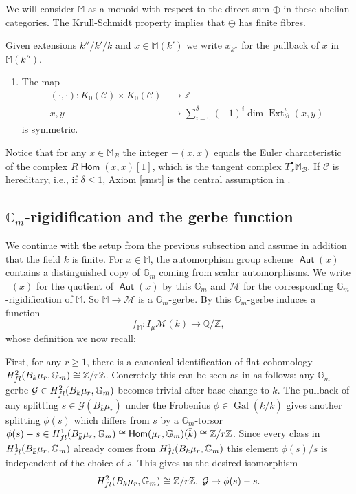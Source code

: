 \documentclass{article}
\newcommand{\Cc}{\mathcal{C}}
\DeclareMathOperator{\Hom}{\mathsf{Hom}}
\DeclareMathOperator{\Gal}{Gal}
\DeclareMathOperator{\Aut}{\mathsf{Aut}}
\DeclareMathOperator{\uAut}{\underline{\mathsf{Aut}}}
\DeclareMathOperator{\Bc}{\mathcal{B}}
\newcommand{\BG}{{\mathbb{G}}}
\newcommand{\BM}{{\mathbb{M}}}
\newcommand{\BQ}{{\mathbb{Q}}}
\newcommand{\BZ}{{\mathbb{Z}}}
\newcommand{\CG}{{\mathcal G}}
\newcommand{\CM}{{\mathcal M}}
\DeclareMathOperator{\Ext}{Ext}
\theoremstyle{definition}
\theoremstyle{plain}
\begin{document}
We will consider $\BM$ as a monoid with respect to the direct sum $\oplus$ in these abelian categories. The Krull-Schmidt property implies that $\oplus$ has finite fibres. 

Given extensions $k''/k'/k$ and $x \in \BM(k')$ we write $x_{k''}$ for the pullback of $x$ in $\BM(k'')$. 



\begin{enumerate}[resume]
    \item\label{smst} The map 
    \begin{align*} (\cdot,\cdot): K_0(\Cc) \times K_0(\Cc) &\to \BZ \\ x,y &\mapsto \sum_{i=0}^\delta  (-1)^i\dim\Ext^i_{\Bc}(x,y)
        \end{align*}
        is symmetric.
\end{enumerate}

Notice that for any $x \in \BM_{\Bc}$ the integer $-(x,x)$ equals the Euler characteristic of the complex $R\Hom(x,x)[1]$, which is the tangent complex $T^{\bullet}_x\BM_{\Bc}$.
If $\Cc$ is hereditary, i.e., if $\delta \leq 1$, Axiom \ref{smst} is the central assumption in \cite{Me15}. 


\subsection{$\BG_m$-rigidification and the gerbe function}\label{gmgr}

We continue with the setup from the previous subsection and assume in addition that the field $k$ is finite. For $x \in \BM$, the automorphism group scheme $\Aut(x)$ contains a distinguished copy of $\BG_m$ coming from scalar automorphisms. We write $\uAut(x)$ for the quotient of $\Aut(x)$ by this $\BG_m$ and $\CM$ for the corresponding $\BG_m$-rigidification of $\BM$. So $\BM \to \CM$ is a $\BG_m$-gerbe. By \cite[Def. 3.6]{GWZ20b} this $\BG_m$-gerbe induces a function
\begin{equation*}
    f_{\BM}\colon I_{\hat\mu}\CM(k)\to \BQ/\BZ,
\end{equation*}
whose definition we now recall: 

First, for any $r \geq 1$, there is a canonical identification of flat cohomology $H^2_{\rm fl}(B_k \mu_r,\BG_m) \cong \BZ/r \BZ$. Concretely this can be seen as in \cite[Lemma 3.4]{GWZ20b} as follows: any $\BG_m$-gerbe $\CG \in H^2_{\rm fl}(B_k \mu_r,\BG_m)$ becomes trivial after base change to $\bar k$. The pullback of any splitting $s \in \CG(B_{\bar k} \mu_r)$ under the Frobenius $\phi \in \Gal(\bar k / k)$ gives another splitting $\phi(s)$ which differs from $s$ by a $\BG_m$-torsor $\phi(s)-s \in H^1_{\rm fl}(B_{\bar k} \mu_r,\BG_m)\cong \Hom(\mu_r,\BG_m)(\bar k)\cong \BZ/r \BZ$. Since every class in $H^1_{\rm fl}(B_{\bar k} \mu_r,\BG_m)$ already comes from $H^1_{\rm fl}(B_k \mu_r,\BG_m)$ this element $\phi(s)/s$ is independent of the choice of $s$. This gives us the desired isomorphism
\begin{equation*}
    H^2_{\rm fl}(B_k \mu_r,\BG_m) \cong \BZ/r \BZ, \;\CG \mapsto \phi(s)-s.
\end{equation*}
    
\end{document}
